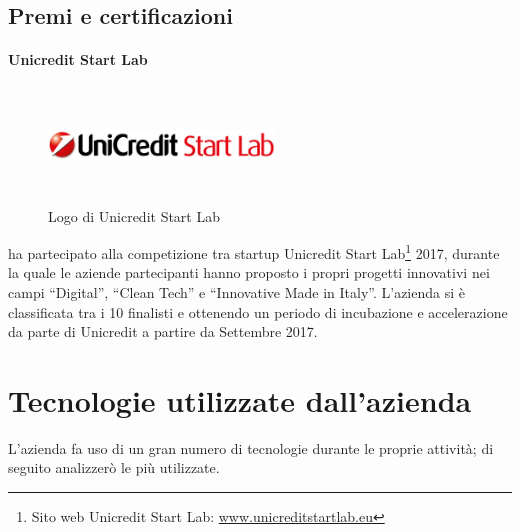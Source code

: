    \subsection{Premi e certificazioni}
   \paragraph{Unicredit Start Lab}
   \begin{figure}[H]
      \begin{center}
         \includegraphics[width=6cm,height=3cm,keepaspectratio]{immagini/unicreditstartlab-logo}
      \end{center}
      \caption{Logo di Unicredit Start Lab}\label{logounicreditstartlab}
   \end{figure}
   \nomeAzienda{} ha partecipato alla competizione tra startup Unicredit Start Lab\footnote{Sito web Unicredit Start Lab: \href{www.unicreditstartlab.eu}{www.unicreditstartlab.eu}} 2017, durante la quale le aziende partecipanti hanno proposto i propri progetti innovativi nei campi ``Digital'', ``Clean Tech'' e ``Innovative Made in Italy''. L'azienda si è classificata tra i 10 finalisti e ottenendo un periodo di incubazione e accelerazione da parte di Unicredit a partire da Settembre 2017.

\section{Tecnologie utilizzate dall'azienda}
L'azienda fa uso di un gran numero di tecnologie durante le proprie attività; di seguito analizzerò le più utilizzate.

